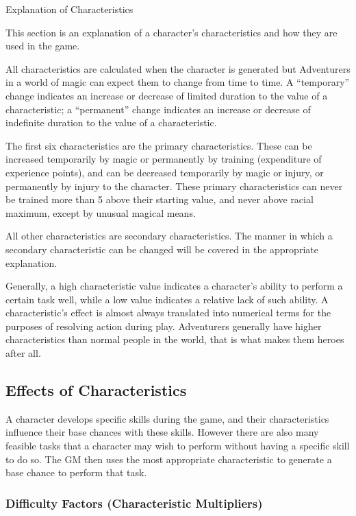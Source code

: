 \begin{Chapter}{Explanation of Characteristics}

This section is an explanation of a character’s characteristics and
how they are used in the game.

All characteristics are calculated when the character is generated but
Adventurers in a world of magic can expect them to change from time to
time.  A “temporary” change indicates an increase or decrease of
limited duration to the value of a characteristic; a “permanent”
change indicates an increase or decrease of indefinite duration to the
value of a characteristic.

The first six characteristics are the primary characteristics.  These
can be increased temporarily by magic or permanently by training
(expenditure of experience points), and can be decreased temporarily
by magic or injury, or permanently by injury to the character.  These
primary characteristics can never be trained more than 5 above their
starting value, and never above racial maximum, except by unusual
magical means.

All other characteristics are secondary characteristics.  The manner
in which a secondary characteristic can be changed will be covered in
the appropriate explanation.

Generally, a high characteristic value indicates a character’s ability
to perform a certain task well, while a low value indicates a relative
lack of such ability.  A characteristic’s effect is almost always
translated into numerical terms for the purposes of resolving action
during play. Adventurers generally have higher characteristics than
normal people in the world, that is what makes them heroes after all.

\subsection{Effects of Characteristics}

A character develops specific skills during the game, and their
characteristics influence their base chances with these skills.
However there are also many feasible tasks that a character may wish
to perform without having a specific skill to do so.  The GM then uses
the most appropriate characteristic to generate a base chance to
perform that task.

\subsubsection{Difficulty Factors (Characteristic Multipliers)}


\end{Chapter}
